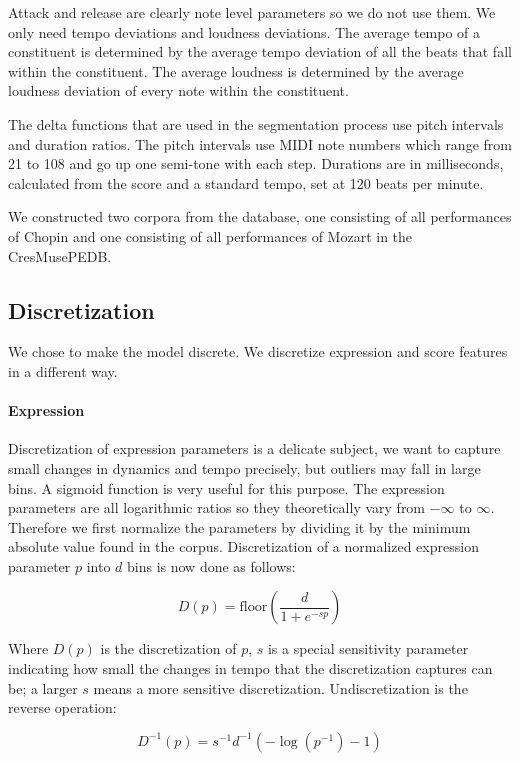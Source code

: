 \documentclass[a4paper,10pt]{article}
\begin{document}
Attack and release are clearly note level parameters so we do not use them. We only need tempo deviations and loudness deviations. The average tempo of a constituent is determined by the average tempo deviation of all the beats that fall within the constituent. The average loudness is determined by the average loudness deviation of every note within the constituent.

The delta functions that are used in the segmentation process use pitch intervals and duration ratios. The pitch intervals use MIDI note numbers which range from 21 to 108 and go up one semi-tone with each step. Durations are in milliseconds, calculated from the score and a standard tempo, set at 120 beats per minute.

We constructed two corpora from the database, one consisting of all performances of Chopin and one consisting of all performances of Mozart in the CresMusePEDB.

\subsection{Discretization}
\label{sec:discretization}

We chose to make the model discrete. We discretize expression and score features in a different way.

\paragraph*{Expression} Discretization of expression parameters is a delicate subject, we want to capture small changes in dynamics and tempo precisely, but outliers may fall in large bins. A sigmoid function is very useful for this purpose. The expression parameters are all logarithmic ratios so they theoretically vary from $-\infty$ to $\infty$. Therefore we first normalize the parameters by dividing it by the minimum absolute value found in the corpus. Discretization of a normalized expression parameter $p$ into $d$ bins is now done as follows:

\[
D(p) = \mbox{floor}\left(\frac{d}{1+e^{-sp}}\right)
\]

Where $D(p)$ is the discretization of $p$, $s$ is a special sensitivity parameter indicating how small the changes in tempo that the discretization captures can be; a larger $s$ means a more sensitive discretization. Undiscretization is the reverse operation:

\[
D^{-1}(p) = s^{-1} d^{-1}(-\log(p^{-1}) - 1)
\]
\end{document}
